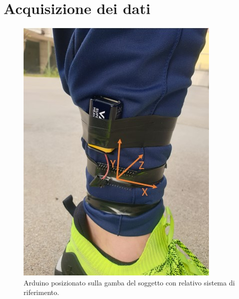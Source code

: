 \clearpage

\section{Acquisizione dei dati}
\begin{figure}[tbh]
	\centering
	\includegraphics[width=0.4\linewidth]{./ImageFiles/arduino_su_gamba_frame.jpg}
	\caption{Arduino posizionato sulla gamba del soggetto con relativo sistema di riferimento.}
	\label{fig:arduino_su_gamba}
\end{figure}

